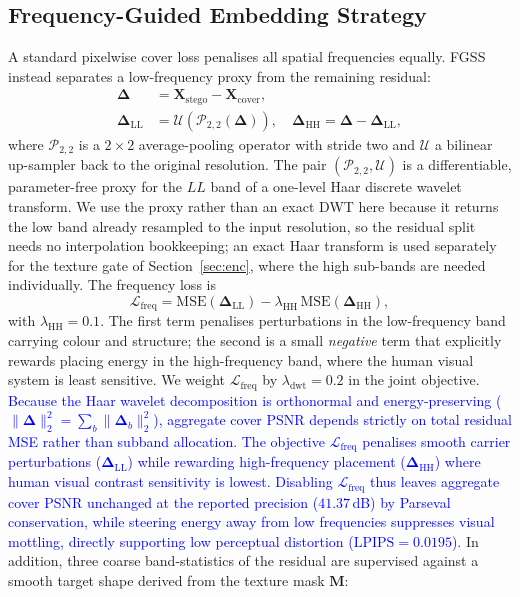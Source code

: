 \documentclass[runningheads]{llncs}
\newcommand{\revised}[1]{\textcolor{blue}{#1}}
\begin{document}
\subsection{Frequency-Guided Embedding Strategy}
\label{sec:freq}
A standard pixelwise cover loss penalises all spatial frequencies equally. FGSS instead separates a low-frequency proxy from the remaining residual:
\begin{align}
    \boldsymbol{\Delta} &= \mathbf{X}_{\text{stego}}-\mathbf{X}_{\text{cover}}, \label{eq:residual_def} \\
    \boldsymbol{\Delta}_{\text{LL}} &= \mathcal{U}\!\left(\mathcal{P}_{2,2}(\boldsymbol{\Delta})\right), \quad
    \boldsymbol{\Delta}_{\text{HH}} = \boldsymbol{\Delta}-\boldsymbol{\Delta}_{\text{LL}},
\end{align}
where $\mathcal{P}_{2,2}$ is a $2\!\times\!2$ average-pooling operator with stride two and $\mathcal{U}$ a bilinear up-sampler back to the original resolution. The pair $(\mathcal{P}_{2,2},\mathcal{U})$ is a differentiable, parameter-free proxy for the $LL$ band of a one-level Haar discrete wavelet transform. We use the proxy rather than an exact DWT here because it returns the low band already resampled to the input resolution, so the residual split needs no interpolation bookkeeping; an exact Haar transform is used separately for the texture gate of Section~\ref{sec:enc}, where the high sub-bands are needed individually. The frequency loss is
\begin{equation}
    \mathcal{L}_{\text{freq}} = \text{MSE}\!\left(\boldsymbol{\Delta}_{\text{LL}}\right) - \lambda_{\text{HH}}\,\text{MSE}\!\left(\boldsymbol{\Delta}_{\text{HH}}\right),
    \label{eq:freq}
\end{equation}
with $\lambda_{\text{HH}}\!=\!0.1$. The first term penalises perturbations in the low-frequency band carrying colour and structure; the second is a small \emph{negative} term that explicitly rewards placing energy in the high-frequency band, where the human visual system is least sensitive. We weight $\mathcal{L}_{\text{freq}}$ by $\lambda_{\text{dwt}}\!=\!0.2$ in the joint objective. \revised{Because the Haar wavelet decomposition is orthonormal and energy-preserving ($\|\boldsymbol{\Delta}\|_2^2 = \sum_b \|\boldsymbol{\Delta}_b\|_2^2$), aggregate cover PSNR depends strictly on total residual MSE rather than subband allocation. The objective $\mathcal{L}_{\text{freq}}$ penalises smooth carrier perturbations ($\boldsymbol{\Delta}_{\text{LL}}$) while rewarding high-frequency placement ($\boldsymbol{\Delta}_{\text{HH}}$) where human visual contrast sensitivity is lowest. Disabling $\mathcal{L}_{\text{freq}}$ thus leaves aggregate cover PSNR unchanged at the reported precision ($41.37$\,dB) by Parseval conservation, while steering energy away from low frequencies suppresses visual mottling, directly supporting low perceptual distortion ($\text{LPIPS}=0.0195$).} In addition, three coarse band-statistics of the residual are supervised against a smooth target shape derived from the texture mask $\mathbf{M}$:
\end{document}
